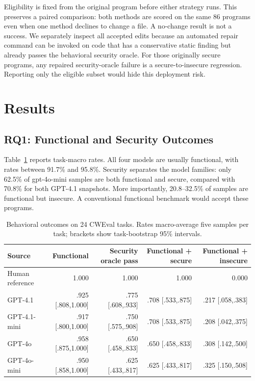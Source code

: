 \documentclass[sigconf,nonacm]{acmart}
\begin{document}
Eligibility is fixed from the original program before either strategy runs.
This preserves a paired comparison: both methods are scored on the same 86
programs even when one method declines to change a file. A no-change result is
not a success. We separately inspect all accepted edits because an automated
repair command can be invoked on code that has a conservative static finding
but already passes the behavioral security oracle. For those originally secure
programs, any repaired security-oracle failure is a secure-to-insecure
regression. Reporting only the eligible subset would hide this deployment risk.

\section{Results}

\subsection{RQ1: Functional and Security Outcomes}

Table~\ref{tab:model-outcomes} reports task-macro rates. All four models are
usually functional, with rates between 91.7\% and 95.8\%. Security separates
the model families: only 62.5\% of gpt-4o-mini samples are both functional and
secure, compared with 70.8\% for both GPT-4.1 snapshots. More importantly,
20.8--32.5\% of samples are functional but insecure. A conventional functional
benchmark would accept these programs.

\begin{table}[t]
\caption{Behavioral outcomes on 24 CWEval tasks. Rates macro-average five
samples per task; brackets show task-bootstrap 95\% intervals.}
\label{tab:model-outcomes}
\centering
\small
\begin{tabular}{lrrrr}
\toprule
Source & Functional & Security oracle pass & Functional + secure & Functional + insecure \\
\midrule
Human reference & 1.000 & 1.000 & 1.000 & 0.000 \\
GPT-4.1 & .925 [.808,1.000] & .775 [.608,.933] & .708 [.533,.875] & .217 [.058,.383] \\
GPT-4.1-mini & .917 [.800,1.000] & .750 [.575,.908] & .708 [.533,.875] & .208 [.042,.375] \\
GPT-4o & .958 [.875,1.000] & .650 [.458,.833] & .650 [.458,.833] & .308 [.142,.500] \\
GPT-4o-mini & .950 [.858,1.000] & .625 [.433,.817] & .625 [.433,.817] & .325 [.150,.508] \\
\bottomrule
\end{tabular}
\end{table}
\end{document}
